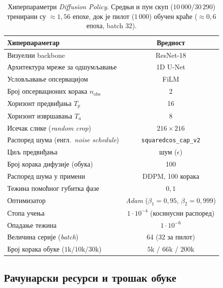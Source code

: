 \documentclass[12pt, a4paper]{article}
\begin{document}
\begin{table}[htbp]
    \caption{Хиперпараметри \textit{Diffusion Policy}. Средњи и пун скуп ($10\,000$/$30\,290$) тренирани су $\approx 1{,}56$ епохе, док је пилот ($1\,000$) обучен краће ($\approx 0{,}6$ епоха, batch $32$).}
    \label{tab:dp_hparams}
    \centering
    \begin{tabular}{l c}
        \toprule
        Хиперпараметар & Вредност \\
        \midrule
        Визуелни backbone & ResNet-18 \\
        Архитектура мреже за одшумљавање & 1D U-Net \\
        Условљавање опсервацијом & FiLM \\
        Број опсервационих корака $n_{\mathrm{obs}}$ & 2 \\
        Хоризонт предвиђања $T_p$ & 16 \\
        Хоризонт извршавања $T_a$ & 8 \\
        Исечак слике (\textit{random crop}) & $216 \times 216$ \\
        Распоред шума (енгл.\ \textit{noise schedule}) & \texttt{squaredcos\_cap\_v2} \\
        Циљ предвиђања & шум ($\epsilon$) \\
        Број корака дифузије (обука) & 100 \\
        Распоред шума у примени & DDPM, 100 корака \\
        Тежина помоћног губитка фазе & $0{,}1$ \\
        Оптимизатор & \textit{Adam} ($\beta_1{=}0{,}95$, $\beta_2{=}0{,}999$) \\
        Стопа учења & $1\cdot 10^{-4}$ (косинусни распоред) \\
        Опадање тежина & $1\cdot 10^{-6}$ \\
        Величина серије (\textit{batch}) & 64 ($32$ за пилот) \\
        Број корака обуке ($1$k/$10$k/$30$k) & $5$k / $66$k / $200$k \\
        \bottomrule
    \end{tabular}
\end{table}

\subsection{Рачунарски ресурси и трошак обуке}
\label{subsec:racunarski_resursi}
\end{document}
